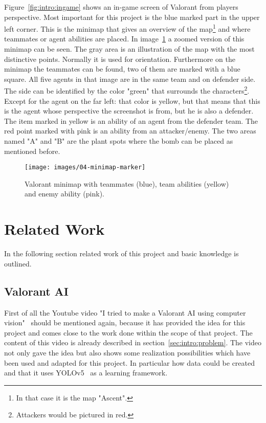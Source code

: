 Figure~\ref{fig:intro:ingame} shows an in-game screen of Valorant from players perspective. Most 
important for this project is the blue marked part in the upper left corner. This is the minimap that 
gives an overview of the map\footnote{In that case it is the map "Ascent".} and where teammates or 
agent abilities are placed. In image~\ref{fig:intro:minimap} a zoomed version of this minimap can be 
seen. The gray area is an illustration of the map with the most distinctive points. Normally it is used 
for orientation. Furthermore on the minimap the teammates can be found, two of them are marked 
with a blue square. All five agents in that image are in the same team and on defender side. The side 
can be identified by the color "green" that surrounds the characters\footnote{Attackers would be 
pictured in red.}.  Except for the agent on the far left: that color is yellow, but that means that this is 
the agent whose perspective the screenshot is from, but he is also a defender. The item marked in 
yellow is an ability of an agent from the defender team. The red point marked with pink is an ability 
from an attacker/enemy. The two areas named "A" and "B" are the plant spots where the bomb can 
be placed as mentioned before.

\begin{figure}
	\centering
	\texttt{[image: images/04-minimap-marker]}
	\caption[Valorant minimap.]{Valorant minimap with teammates (blue), team abilities (yellow) and 
	enemy ability (pink).}
	\label{fig:intro:minimap}
\end{figure}


\section{Related Work}\label{sec:intro:relatedWork}

In the following section related work of this project and basic knowledge is outlined.

\subsection[Video: Valorant AI]{Valorant AI}\label{subsec:intro:video}

First of all the Youtube video "I tried to make a Valorant AI using computer vision"~\cite{river2021} 
should be mentioned again, because it has provided the idea for this project and comes close to 
the work done within the scope of that project. The content of this video is already described in 
section~\ref{sec:intro:problem}. The video not only gave the idea but also shows some realization 
possibilities which have been used and adapted for this project. In particular how data could be 
created and that it uses YOLOv5~\cite{jocher2020} as a learning framework.

